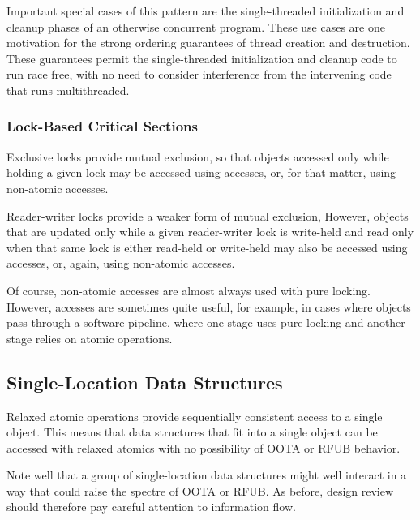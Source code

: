\documentclass[10]{article}
\begin{document}
Important special cases of this pattern are the single-threaded
initialization and cleanup phases of an otherwise concurrent program.
These use cases are one motivation for the strong ordering guarantees
of thread creation and destruction.
These guarantees permit the single-threaded initialization and cleanup
code to run race free, with no need to consider interference from the
intervening code that runs multithreaded.

\subsubsection{Lock-Based Critical Sections}
\label{sec:Lock-Based Critical Sections}

Exclusive locks provide mutual exclusion, so that objects accessed
only while holding a given lock may be accessed using
 accesses, or, for that matter, using
non-atomic accesses.

Reader-writer locks provide a weaker form of mutual exclusion,
However, objects that are updated only while a given reader-writer
lock is write-held and read only when that same lock is either
read-held or write-held may also be accessed using
 accesses, or, again, using non-atomic accesses.

Of course, non-atomic accesses are almost always used with pure locking.
However,  accesses are sometimes quite useful,
for example, in cases where objects pass through a software pipeline,
where one stage uses pure locking and another stage relies on atomic
operations.


\subsection{Single-Location Data Structures}
\label{sec:Single-Location Data Structures}

Relaxed atomic operations provide sequentially consistent access to
a single object.
This means that data structures that fit into a single object can
be accessed with relaxed atomics with no possibility of OOTA or
RFUB behavior.

Note well that a group of single-location data structures might well
interact in a way that could raise the spectre of OOTA or RFUB.
As before, design review should therefore pay careful attention to
information flow.
\end{document}
